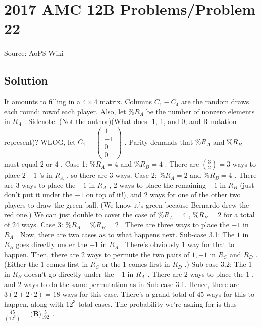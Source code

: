 \documentclass[12pt]{article}
\begin{document}
\section*{{2017 AMC 12B Problems/Problem 22}}
Source: AoPS Wiki

\subsection*{Solution}
It amounts to filling in a $4 \times 4$ matrix. Columns $C_1 - C_4$ are the random draws each round; rowof each player. Also, let $\%R_A$ be the number of nonzero elements in $R_A$ .
Sidenote: (Not the author)(What does -1, 1, and 0, and R notation represent)? WLOG, let $C_1 = \begin{pmatrix} 1\\-1\\0\\0\end{pmatrix}$ . Parity demands that $\%R_A$ and $\%R_B$ must equal $2$ or $4$ . Case 1: $\%R_A = 4$ and $\%R_B = 4$ . There are $\binom{3}{2}=3$ ways to place $2$ $-1$ 's in $R_A$ , so there are $3$ ways. Case 2: $\%R_A = 2$ and $\%R_B=4$ . There are $3$ ways to place the $-1$ in $R_A$ , $2$ ways to place the remaining $-1$ in $R_B$ (just don't put it under the $-1$ on top of it!), and $2$ ways for one of the other two players to draw the green ball. (We know it's green because Bernardo drew the red one.) We can just double to cover the case of $\%R_A = 4$ , $\%R_B = 2$ for a total of $24$ ways. Case 3: $\%R_A=\%R_B=2$ . There are three ways to place the $-1$ in $R_A$ . Now, there are two cases as to what happens next. Sub-case 3.1: The $1$ in $R_B$ goes directly under the $-1$ in $R_A$ . There's obviously $1$ way for that to happen. Then, there are $2$ ways to permute the two pairs of $1, -1$ in $R_C$ and $R_D$ . (Either the $1$ comes first in $R_C$ or the $1$ comes first in $R_D$ .) Sub-case 3.2: The $1$ in $R_B$ doesn't go directly under the $-1$ in $R_A$ . There are $2$ ways to place the $1$ , and $2$ ways to do the same permutation as in Sub-case 3.1.
Hence, there are $3(2+2 \cdot 2)=18$ ways for this case. There's a grand total of $45$ ways for this to happen, along with $12^3$ total cases. The probability we're asking for is thus $\frac{45}{(12^3)}= \boxed{\textbf{(B)}\frac{5}{192}}$ .
\end{document}
